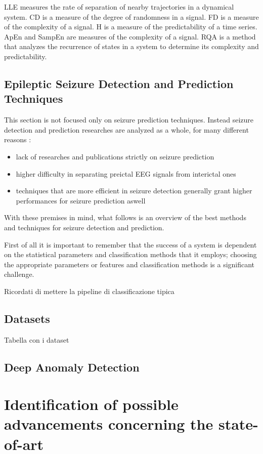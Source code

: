 \gls{LLE} measures the rate of separation of nearby trajectories in a dynamical system. \gls{CD} is a measure of the degree of randomness in a signal. \gls{FD} is a measure of the complexity of a signal. \gls{H} is a measure of the predictability of a time series. \gls{ApEn} and \gls{SampEn} are measures of the complexity of a signal. \gls{RQA} is a method that analyzes the recurrence of states in a system to determine its complexity and predictability.


\subsection{Epileptic Seizure Detection and Prediction Techniques}
This section is not focused only on seizure prediction techniques. Instead seizure detection and prediction researches are analyzed as a whole, for many different reasons \cite{gadhoumi_seizure_2016, bou_assi_towards_2017, natu_review_2022}:

\begin{itemize}
    \item lack of researches and publications strictly on seizure prediction 
    \item higher difficulty in separating preictal \gls{EEG} signals from interictal ones
    \item techniques that are more efficient in seizure detection generally grant higher performances for seizure prediction aswell
\end{itemize}

With these premises in mind, what follows is an overview of the best methods and techniques for seizure detection and prediction.

First of all it is important to remember that the success of a system is dependent on the statistical parameters and classification methods that it employs; choosing the appropriate parameters or features and classification methods is a significant challenge.




\cite{natu_review_2022}
Ricordati di mettere la pipeline di classificazione tipica

\subsection{Datasets}
Tabella con i dataset

\subsection{Deep Anomaly Detection}


\section{Identification of possible advancements concerning the state-of-art}

